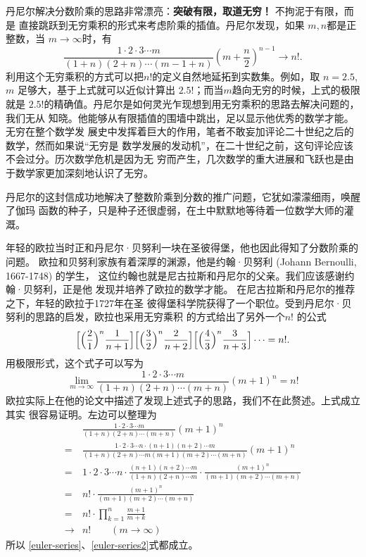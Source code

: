 {丹尼尔解决分数阶乘的思路非常漂亮：{\bf 突破有限，取道无穷！} 不拘泥于有限，而是
直接跳跃到无穷乘积的形式来考虑阶乘的插值。丹尼尔发现，如果 $m,n$都是正整数，当 $m
\rightarrow \infty$时，有
$$ \frac{1\cdot 2\cdot 3 \cdots m}{(1+n)(2+n)\cdots (m-1+n)}(m+\frac{n}{2})^{n-1} 
\rightarrow n! .$$
利用这个无穷乘积的方式可以把$n!$的定义自然地延拓到实数集。例如，取 $n=2.5$, $m$
足够大，基于上式就可以近似计算出 $2.5!$；而当$m$趋向无穷的时候，上式的极限就是
$2.5!$的精确值。丹尼尔是如何灵光乍现想到用无穷乘积的思路去解决问题的，我们无从
知晓。他能够从有限插值的围墙中跳出，足以显示他优秀的数学才能。无穷在整个数学发
展史中发挥着巨大的作用，笔者不敢妄加评论二十世纪之后的数学，然而如果说“无穷是
数学发展的发动机”，在二十世纪之前，这句评论应该不会过分。历次数学危机是因为无
穷而产生，几次数学的重大进展和飞跃也是由于数学家更加深刻地认识了无穷。 

丹尼尔的这封信成功地解决了整数阶乘到分数的推广问题，它犹如濛濛细雨，唤醒了伽玛
函数的种子，只是种子还很虚弱，在土中默默地等待着一位数学大师的灌溉。

年轻的欧拉当时正和丹尼尔·贝努利一块在圣彼得堡，他也因此得知了分数阶乘的问题。
欧拉和贝努利家族有着深厚的渊源，他是约翰·贝努利 (Johann Bernoulli, 1667-1748)
的学生， 这位约翰也就是尼古拉斯和丹尼尔的父亲。我们应该感谢约翰·贝努利，正是他
发现并培养了欧拉的数学才能。 在尼古拉斯和丹尼尔的推荐之下，年轻的欧拉于1727年在圣
彼得堡科学院获得了一个职位。受到丹尼尔·贝努利的思路的启发，欧拉也采用无穷乘积
的方式给出了另外一个$n!$ 的公式
\begin{equation}
\label{euler-series}
\Bigl[\Bigl(\frac{2}{1}\Bigr)^n\frac{1}{n+1}\Bigr]
\Bigl[\Bigl(\frac{3}{2}\Bigr)^n\frac{2}{n+2}\Bigr]
\Bigl[\Bigl(\frac{4}{3}\Bigr)^n\frac{3}{n+3}\Bigr] \cdots = n! .
\end{equation}
用极限形式，这个式子可以写为
\begin{equation}
\label{euler-series2}
\lim_{m \rightarrow \infty} \frac{1\cdot 2\cdot 3 \cdots m}{(1+n)(2+n)\cdots (m+n)}(m+1)^{n} = n!
\end{equation}
欧拉实际上在他的论文中描述了发现上述式子的思路，我们不在此赘述。上式成立其实
很容易证明。左边可以整理为
\begin{align*}
& \frac{1\cdot 2\cdot 3 \cdots m}{(1+n)(2+n)\cdots (m+n)}(m+1)^{n}  \\
= & \frac{1\cdot 2\cdot 3 \cdots n \cdot (n+1)(n+2) \cdots m}{(1+n)(2+n)\cdots m (m+1)(m+2)\cdots (m+n)}
     (m+1)^{n} \\
= & 1\cdot 2\cdot 3 \cdots n \cdot \frac{(n+1)(n+2) \cdots m}{(1+n)(2+n)\cdots m }
     \cdot \frac{(m+1)^{n}}{(m+1)(m+2)\cdots (m+n)} \\
= & n! \cdot \frac{(m+1)^{n}}{(m+1)(m+2)\cdots (m+n)} \\
= & n! \cdot \prod_{k=1}^{n} \frac{m+1}{m+k}  \\
\rightarrow & n! \qquad (m\rightarrow \infty)
\end{align*}
所以 \eqref{euler-series}、\eqref{euler-series2}式都成立。

}

